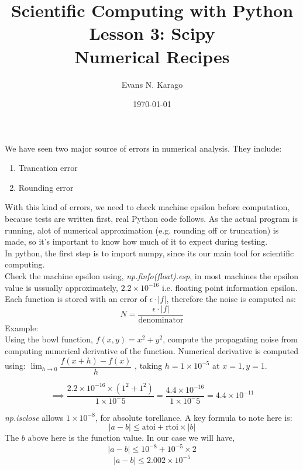 \documentclass[11pt]{article}
\title{Scientific Computing with Python\\ \Large Lesson 3: Scipy \\ \large Numerical Recipes}
\author{Evans N. Karago}
\date{\today}
\begin{document}
\maketitle
We have seen two major source of errors in numerical analysis. They include:
\begin{enumerate}
\item Trancation error
\item Rounding error
\end{enumerate}
With this kind of errors, we need to check machine epsilon before computation, because tests are written first, real Python code follows. As the actual program is running, alot of numerical approximation (e.g. rounding off or truncation) is made, so it's important to know how much of it to expect during testing.\\[2ex]
In python, the first step is to import numpy, since its our main tool for scientific computing.\\[2ex]
Check the machine epsilon using, \textit{np.finfo(float).esp}, in most machines the epsilon value is ussually approximately, $2.2 \times 10 ^{-16}$ i.e. floating point information epsilon.
\\[2ex]
Each function is stored with an error of $\epsilon \cdot |f|$, therefore the noise is computed as:
\[
N = \frac{\epsilon \cdot |f|}{\text{denominator}}
\]  
Example:\\[2ex]

Using the bowl function, $f(x, y) =x^2 + y^2$, compute the propagating noise from computing numerical derivative of the function.  Numerical derivative is computed using: $\lim_{h \to 0}\dfrac{f(x + h) - f(x)}{h}$ , taking $h = 1 \times 10 ^{-5}$ at $x = 1, y = 1$.

\[
\implies
\frac{2.2 \times 10^{-16} \times (1^2 + 1^2)}{1 \times 10^-5} = \frac{4.4 \times 10 ^{-16}}{1 \times 10^-{5}} = 4.4 \times 10 ^{-11}
\]

\textit{np.isclose} allows $1 \times 10 ^{-8}$, for absolute torellance. A key formula to note here is: 
\[
|a - b| \leq \text{atoi} + \text{rtoi} \times |b|
\]
The $b$ above here is the function value. In our case we will have, 
\[
|a - b| \leq 10^{-8} + 10^{-5} \times 2 
\]
\[
|a - b| \leq 2.002 \times 10 ^ {-5}
\]
\end{document}
